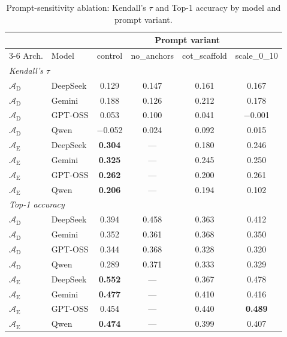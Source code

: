 \documentclass[11pt]{article}
\begin{document}
\begin{table}[htbp]
\centering
\footnotesize
\centering
\caption{Prompt-sensitivity ablation: Kendall's $\tau$ and Top-1 accuracy by model and prompt variant.}
\label{tab:prompt_ablation}
\renewcommand{\arraystretch}{1.15}
\setlength{\tabcolsep}{4pt}
\begin{tabular}{llcccc}
\toprule
& & \multicolumn{4}{c}{Prompt variant} \\
\cmidrule(lr){3-6}
Arch. & Model & control & no\_anchors & cot\_scaffold & scale\_0\_10 \\
\midrule
\multicolumn{6}{l}{\emph{Kendall's $\tau$}} \\
$\mathcal{A}_{\text{D}}$ & DeepSeek & 0.129 & 0.147 & 0.161 & 0.167 \\
$\mathcal{A}_{\text{D}}$ & Gemini   & 0.188 & 0.126 & 0.212 & 0.178 \\
$\mathcal{A}_{\text{D}}$ & GPT-OSS  & 0.053 & 0.100 & 0.041 & $-$0.001 \\
$\mathcal{A}_{\text{D}}$ & Qwen     & $-$0.052 & 0.024 & 0.092 & 0.015 \\
$\mathcal{A}_{\text{E}}$ & DeepSeek & \textbf{0.304} & --- & 0.180 & 0.246 \\
$\mathcal{A}_{\text{E}}$ & Gemini   & \textbf{0.325} & --- & 0.245 & 0.250 \\
$\mathcal{A}_{\text{E}}$ & GPT-OSS  & \textbf{0.262} & --- & 0.200 & 0.261 \\
$\mathcal{A}_{\text{E}}$ & Qwen     & \textbf{0.206} & --- & 0.194 & 0.102 \\
\midrule
\multicolumn{6}{l}{\emph{Top-1 accuracy}} \\
$\mathcal{A}_{\text{D}}$ & DeepSeek & 0.394 & 0.458 & 0.363 & 0.412 \\
$\mathcal{A}_{\text{D}}$ & Gemini   & 0.352 & 0.361 & 0.368 & 0.350 \\
$\mathcal{A}_{\text{D}}$ & GPT-OSS  & 0.344 & 0.368 & 0.328 & 0.320 \\
$\mathcal{A}_{\text{D}}$ & Qwen     & 0.289 & 0.371 & 0.333 & 0.329 \\
$\mathcal{A}_{\text{E}}$ & DeepSeek & \textbf{0.552} & --- & 0.367 & 0.478 \\
$\mathcal{A}_{\text{E}}$ & Gemini   & \textbf{0.477} & --- & 0.410 & 0.416 \\
$\mathcal{A}_{\text{E}}$ & GPT-OSS  & 0.454 & --- & 0.440 & \textbf{0.489} \\
$\mathcal{A}_{\text{E}}$ & Qwen     & \textbf{0.474} & --- & 0.399 & 0.407 \\
\bottomrule
\end{tabular}
\setlength{\tabcolsep}{6pt}
\renewcommand{\arraystretch}{1.0}
\end{table}
\end{document}
